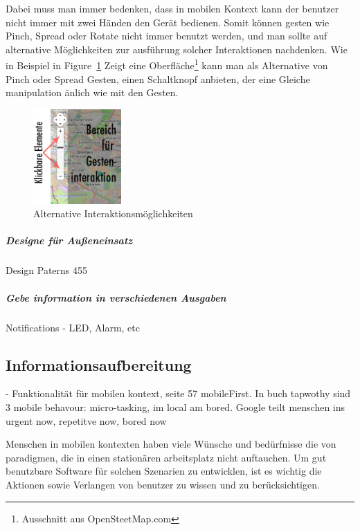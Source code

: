 Dabei muss man immer bedenken, dass in mobilen Kontext kann der benutzer nicht immer mit zwei Händen den Gerät bedienen. Somit können gesten wie Pinch, Spread oder Rotate nicht immer benutzt werden, und man sollte auf alternative Möglichkeiten zur ausführung solcher Interaktionen nachdenken. Wie in Beispiel in Figure~\ref{fig:nuibsp} Zeigt eine Oberfläche\footnote{Ausschnitt aus OpenSteetMap.com} kann man als Alternative von Pinch oder Spread Gesten, einen Schaltknopf anbieten, der eine Gleiche manipulation änlich wie mit den Gesten.

\begin{figure}
	\begin{center}
	
	\includegraphics[width=0.3\textwidth]{img/NUIbsp.png}
	\caption{Alternative Interaktionsmöglichkeiten}\label{fig:nuibsp}
\end{center}
\end{figure}

\subparagraph{Designe für Außeneinsatz} %
\label{subp:designe_f_r_au_eneinsatz}

Design Paterns 455

\subparagraph{Gebe information in verschiedenen Ausgaben}
\label{subp:gebe_information_in_verschiedenen_ausgaben}

Notifications - LED, Alarm, etc

\subsection{Informationsaufbereitung}

- Funktionalität für mobilen kontext, seite 57 mobileFirst. In buch tapwothy sind 3 mobile behavour: micro-tasking, im local am bored. Google teilt menschen ins urgent now, repetitve now, bored now

Menschen in mobilen kontexten haben viele Wünsche und bedürfnisse die von paradigmen, die in einen stationären arbeitsplatz nicht auftauchen. Um gut benutzbare Software für solchen Szenarien zu entwicklen, ist es wichtig die Aktionen sowie Verlangen von benutzer zu wissen und zu berücksichtigen. 

